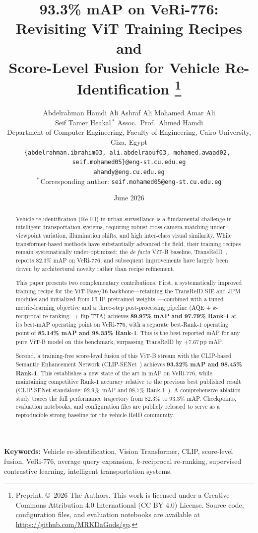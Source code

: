 \documentclass[11pt]{article}
\title{\bfseries 93.3\% mAP on VeRi-776: Revisiting ViT Training Recipes and\\
       Score-Level Fusion for Vehicle Re-Identification%
\thanks{Preprint. \copyright~2026 The Authors. This work is licensed under a
  Creative Commons Attribution 4.0 International (CC BY 4.0) License. Source
  code, configuration files, and evaluation notebooks are available at
  \url{https://github.com/MRKDaGods/gp}.}}
\author{
  Abdelrahman Hamdi \quad Ali Ashraf Ali \quad Mohamed Amar Ali \\[4pt]
  Seif Tamer Heakal\,$^{\ast}$ \quad Assoc.\ Prof.\ Ahmed Hamdi \\[6pt]
  \normalsize Department of Computer Engineering, Faculty of Engineering,
    Cairo University, Giza, Egypt \\[4pt]
  \footnotesize\texttt{\{abdelrahman.ibrahim03,\,ali.abdelraouf03,\,mohamed.awaad02,\,seif.mohamed05\}@eng-st.cu.edu.eg} \\[1pt]
  \footnotesize\texttt{ahamdy@eng.cu.edu.eg} \\[4pt]
  \normalsize $^{\ast}$\,Corresponding author: \texttt{seif.mohamed05@eng-st.cu.edu.eg}
}
\date{June 2026}
\begin{document}
\maketitle
\thispagestyle{fancy}

\begin{abstract}
Vehicle re-identification (Re-ID) in urban surveillance is a fundamental
challenge in intelligent transportation systems, requiring robust cross-camera
matching under viewpoint variation, illumination shifts, and high inter-class
visual similarity. While transformer-based methods have substantially advanced
the field, their training recipes remain systematically under-optimized: the
\emph{de facto} ViT-B baseline, TransReID~\cite{he2021transreid}, reports
82.3\% mAP on VeRi-776, and subsequent improvements have largely been driven
by architectural novelty rather than recipe refinement.

This paper presents two complementary contributions. First, a systematically
improved training recipe for the ViT-Base/16 backbone---retaining the TransReID
SIE and JPM modules and initialized from CLIP pretrained
weights~\cite{radford2021clip}---combined with a tuned metric-learning
objective and a three-step post-processing pipeline (AQE + $k$-reciprocal
re-ranking~\cite{zhong2017rerank} + flip TTA) achieves \textbf{89.97\% mAP
and 97.79\% Rank-1} at its best-mAP operating point on VeRi-776, with a
separate best-Rank-1 operating point of \textbf{85.14\% mAP and 98.33\%
Rank-1}. This is the best reported mAP for any pure ViT-B model on this
benchmark, surpassing TransReID by $+7.67$\,pp mAP.

Second, a training-free score-level fusion of this ViT-B stream with the
CLIP-based Semantic Enhancement Network
(CLIP-SENet~\cite{lu2025clipsenet}) achieves \textbf{93.32\% mAP and
98.45\% Rank-1}. This establishes a new state of the art in mAP on VeRi-776, while
maintaining competitive Rank-1 accuracy relative to the previous best published result
(CLIP-SENet standalone: 92.9\%~mAP and 98.7\% Rank-1~\cite{lu2025clipsenet}). A comprehensive ablation
study traces the full performance trajectory from 82.3\% to 93.3\% mAP.
Checkpoints, evaluation notebooks, and configuration files are publicly
released to serve as a reproducible strong baseline for the vehicle ReID
community.
\end{abstract}

\vspace{0.6em}
\noindent\textbf{Keywords:}\;
Vehicle re-identification, Vision Transformer, CLIP, score-level fusion,
VeRi-776, average query expansion, $k$-reciprocal re-ranking, supervised
contrastive learning, intelligent transportation systems.
\end{document}
